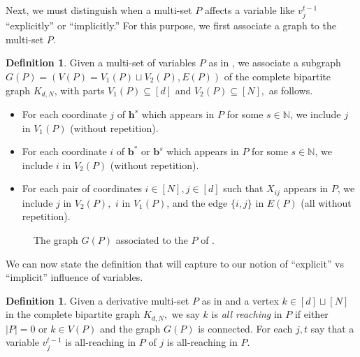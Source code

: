 \documentclass{article}
\newcommand{\1}{\mathbbm{1}}
\theoremstyle{plain}
\theoremstyle{definition}
\newtheorem{definition}[theorem]{Definition}
\theoremstyle{remark}
\newcommand{\bfh}{\boldsymbol{h}}
\newcommand{\bfb}{\boldsymbol{b}}
\newcommand{\N}{\mathbb{N}}
\begin{document}
Next, we must distinguish when a multi-set $P$ affects a variable like $v_j^{t-1}$ ``explicitly'' or ``implicitly.'' For this purpose, we first associate a graph to the multi-set $P.$
\begin{definition}\label{defn:graph-of-P}
    Given a multi-set of variables $P$ as in , we associate a subgraph $G(P) = (V(P) = V_1(P)\sqcup V_2(P), E(P))$ of the complete bipartite graph $K_{d,N}$, with parts $V_1(P)\subseteq [d]$ and $V_2(P)\subseteq [N],$ as follows.
    \begin{itemize}
        \item For each coordinate $j$ of $\bfh^s$ which appears in $P$ for some $s\in \N$, we include $j$ in $V_1(P)$ (without repetition).
        \item For each coordinate $i$ of $\bfb^*$ or $\bfb^s$ which appears in $P$ for some $s\in \N$, we include $i$ in $V_2(P)$ (without repetition).
        \item For each pair of coordinates $i\in [N],j\in [d]$ such that $X_{ij}$ appears in $P$, we include $j$ in $V_2(P),$ $i$ in $V_1(P)$, and the edge $\{i,j\}$ in $E(P)$ (all without repetition).
    \end{itemize}
\end{definition}
\begin{figure}[h]
\centering
{}
\caption{The graph $G(P)$ associated to the $P$ of .}
\label{fig:P-example}
\end{figure}
We can now state the definition that will capture to our notion of ``explicit'' vs ``implicit'' influence of variables.
\begin{definition}\label{defn:all-reaching}
    Given a derivative multi-set $P$ as in  and a vertex $k \in [d]\sqcup [N]$ in the complete bipartite graph $K_{d,N},$ we say $k$ is \emph{all reaching} in $P$ if either $|P|=0$ or $k \in V(P)$ and the graph $G(P)$ is connected. For each $j,t$ say that a variable $v_j^{t-1}$ is all-reaching in $P$ of $j$ is all-reaching in $P.$
\end{definition}
\end{document}
